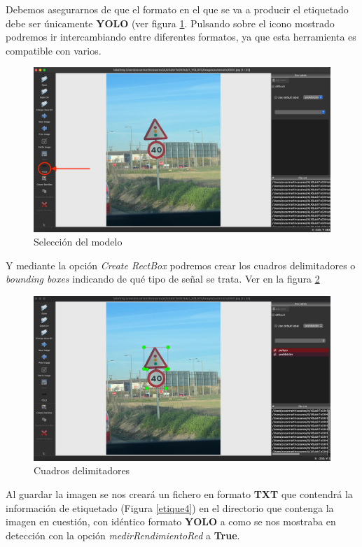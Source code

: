 Debemos asegurarnos de que el formato en el que se va a producir el etiquetado debe ser únicamente \textbf{YOLO} (ver figura \ref{etique2}. Pulsando sobre el icono mostrado podremos ir intercambiando entre diferentes formatos, ya que esta herramienta es compatible con varios.\\

\begin{figure}[H]
	\centering
	\includegraphics[width=\textwidth]{Imagenes/AnexoI_Manual/AA/etiquetado2.pdf}
	\caption{Selección del modelo}
	\label{etique2}
\end{figure}

Y mediante la opción \textit{Create RectBox} podremos crear los cuadros delimitadores o \textit{bounding boxes} indicando de qué tipo de señal se trata. Ver en la figura \ref{etique3}


\begin{figure}[H]
	\centering
	\includegraphics[width=\textwidth]{Imagenes/AnexoI_Manual/AA/etiquetado3.pdf}
	\caption{Cuadros delimitadores}
	\label{etique3}
\end{figure}

Al guardar la imagen se nos creará un fichero en formato \textbf{TXT} que contendrá la información de etiquetado (Figura \ref{etique4}) en el directorio que contenga la imagen en cuestión, con idéntico formato \textbf{YOLO} a como se nos mostraba en detección con la opción \textit{medirRendimientoRed} a \textbf{True}.


